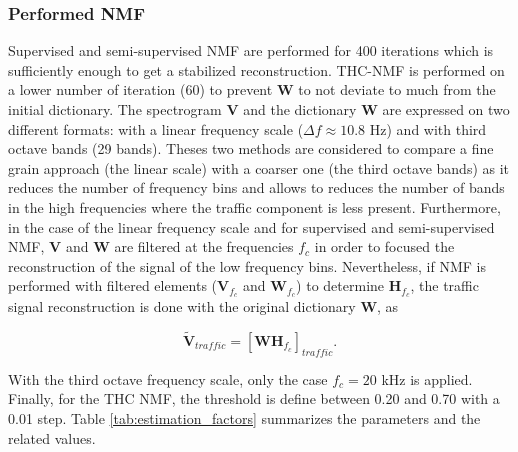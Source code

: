 \documentclass[twocolumn,a4paper,10pt]{article}
\begin{document}
\subsubsection{Performed NMF}

Supervised and semi-supervised NMF are performed for 400 iterations which is sufficiently enough to get a stabilized reconstruction. THC-NMF is performed on a lower number of iteration (60) to prevent $\mathbf{W}$ to not deviate to much from the initial dictionary. The spectrogram $\mathbf{V}$ and the dictionary $\mathbf{W}$ are expressed on two different formats: with a linear frequency scale ($\Delta f \approx 10.8$ Hz) and with third octave bands (29 bands). Theses two methods are considered to compare a fine grain approach (the linear scale) with a coarser one (the third octave bands) as it reduces the number of frequency bins and allows to reduces the number of bands in the high frequencies where the traffic component is less present.  Furthermore, in the case of the linear frequency scale and for supervised and semi-supervised NMF, $\mathbf{V}$ and $\mathbf{W}$ are filtered at the frequencies $f_c$ in order to focused the reconstruction of the signal of the low frequency bins. Nevertheless, if NMF is performed with filtered elements ($\mathbf{V}_{f_c}$ and $\mathbf{W}_{f_c}$) to determine $\mathbf{H}_{f_c}$, the traffic signal reconstruction is done with the original dictionary $\mathbf{W}$, as

\begin{equation}
\mathbf{\tilde{V}}_{traffic} = \left[\mathbf{WH}_{f_c}\right]_{traffic}.
\end{equation}

With the third octave frequency scale, only the case $f_c = 20$ kHz is applied. Finally, for the THC NMF, the threshold is define between 0.20 and 0.70 with a 0.01 step. Table \ref{tab:estimation_factors} summarizes the parameters and the related values.
\end{document}
